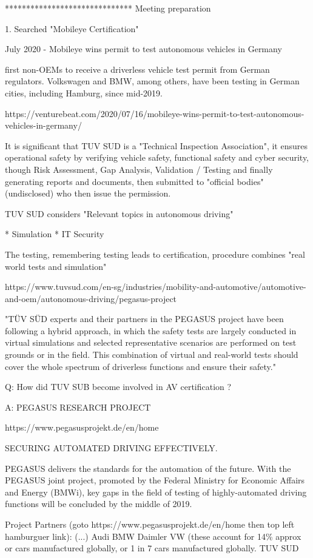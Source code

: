 ******************************
Meeting preparation

1. Searched "Mobileye Certification"

July 2020 - Mobileye wins permit to test autonomous vehicles in Germany

first non-OEMs to receive a driverless vehicle test permit from German regulators. Volkswagen and BMW, among others, have been testing in German cities, including Hamburg, since mid-2019.

https://venturebeat.com/2020/07/16/mobileye-wins-permit-to-test-autonomous-vehicles-in-germany/

It is significant that TUV SUD is a "Technical Inspection Association", it ensures operational safety by verifying vehicle safety, functional safety and cyber security, though Risk Assessment, Gap Analysis, Validation / Testing and finally generating reports and documents, then submitted to "official bodies" (undisclosed) who then issue the permission.

TUV SUD considers
"Relevant topics in autonomous driving"

* Simulation
* IT Security

The testing, remembering testing leads to certification, procedure combines "real world tests and simulation"

https://www.tuvsud.com/en-sg/industries/mobility-and-automotive/automotive-and-oem/autonomous-driving/pegasus-project

"TÜV SÜD experts and their partners in the PEGASUS project have been following a hybrid approach, in which the safety tests are largely conducted in virtual simulations and selected representative scenarios are performed on test grounds or in the field. This combination of virtual and real-world tests should cover the whole spectrum of driverless functions and ensure their safety."
 
Q: How did TUV SUB become involved in AV certification ?

A: PEGASUS RESEARCH PROJECT

https://www.pegasusprojekt.de/en/home

SECURING AUTOMATED DRIVING EFFECTIVELY.

PEGASUS delivers the standards for the automation of the future. With the PEGASUS joint project, promoted by the Federal Ministry for Economic Affairs and Energy (BMWi), key gaps in the field of testing of highly-automated driving functions will be concluded by the middle of 2019.

Project Partners (goto https://www.pegasusprojekt.de/en/home then top left hamburguer link):
(...)
Audi
BMW
Daimler
VW (these account for 14\% approx or cars manufactured globally, or 1 in 7 cars manufactured globally.
TUV SUD

